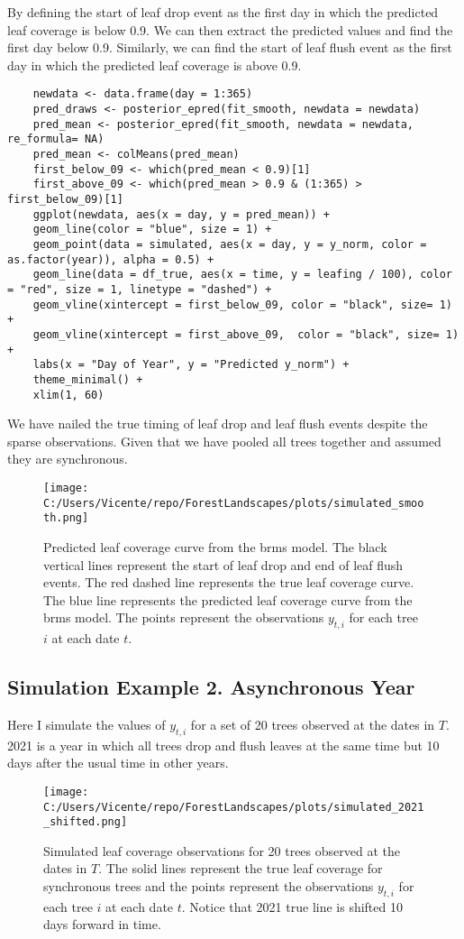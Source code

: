 \documentclass{article}
\begin{document}
By defining the start of leaf drop event as the first day in which the predicted leaf coverage is below 0.9.
We can then extract the predicted values and find the first day below 0.9.
Similarly, we can find the start of leaf flush event as the first day in which the predicted leaf coverage is above 0.9.

\begin{verbatim}
    newdata <- data.frame(day = 1:365)
    pred_draws <- posterior_epred(fit_smooth, newdata = newdata)
    pred_mean <- posterior_epred(fit_smooth, newdata = newdata, re_formula= NA)
    pred_mean <- colMeans(pred_mean)
    first_below_09 <- which(pred_mean < 0.9)[1]
    first_above_09 <- which(pred_mean > 0.9 & (1:365) > first_below_09)[1]
    ggplot(newdata, aes(x = day, y = pred_mean)) +
    geom_line(color = "blue", size = 1) +
    geom_point(data = simulated, aes(x = day, y = y_norm, color = as.factor(year)), alpha = 0.5) +
    geom_line(data = df_true, aes(x = time, y = leafing / 100), color = "red", size = 1, linetype = "dashed") +
    geom_vline(xintercept = first_below_09, color = "black", size= 1) +
    geom_vline(xintercept = first_above_09,  color = "black", size= 1) +
    labs(x = "Day of Year", y = "Predicted y_norm") +
    theme_minimal() +
    xlim(1, 60)
\end{verbatim}
We have nailed the true timing of leaf drop and leaf flush events despite the sparse observations.
Given that we have pooled all trees together and assumed they are synchronous.
\begin{figure}
    \centering
    \texttt{[image: C:/Users/Vicente/repo/ForestLandscapes/plots/simulated\_smooth.png]}
    \caption{Predicted leaf coverage curve from the brms model. The black vertical lines represent the start of leaf drop and end of leaf flush events. The red dashed line represents the true leaf coverage curve. The blue line represents the predicted leaf coverage curve from the brms model. The points represent the observations $y_{t, i}$ for each tree $i$ at each date $t$.}
    \label{fig:interpolation_problem_fit}
\end{figure}

\subsection{Simulation Example 2. Asynchronous Year}
Here I simulate the values of $y_{t, i}$ for a set of 20 trees observed at the dates in $T$.
2021 is a year in which all trees drop and flush leaves at the same time but 10 days after the usual time in other years.

\begin{figure}
    \centering
    \texttt{[image: C:/Users/Vicente/repo/ForestLandscapes/plots/simulated\_2021\_shifted.png]}
    \caption{Simulated leaf coverage observations for 20 trees observed at the dates in $T$. The solid lines represent the true leaf coverage for synchronous trees and the points represent the observations $y_{t, i}$ for each tree $i$ at each date $t$. Notice that 2021 true line is shifted 10 days forward in time.}
    \label{fig:interpolation_problem_asynchronous}
\end{figure}
\end{document}
